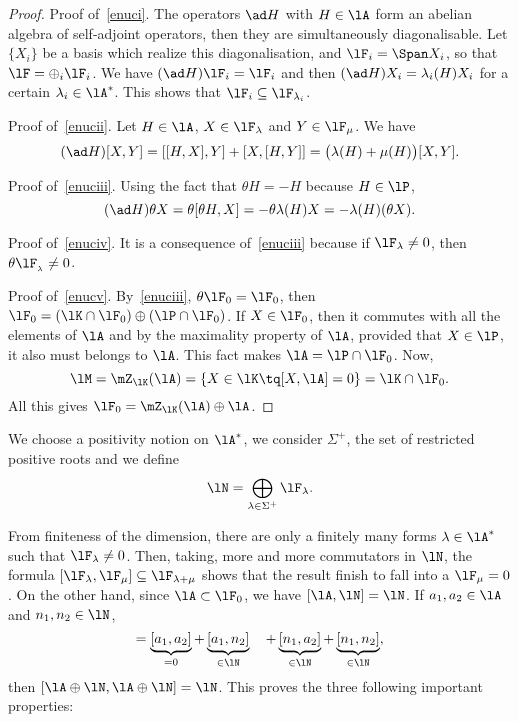 \begin{proof}
	Proof of~\ref{enuci}. The operators $\ad H$ with $H\in\lA$ form an abelian algebra of self-adjoint operators, then they are simultaneously diagonalisable. Let $\{X_i\}$ be a basis which realize this diagonalisation, and $\lF_i=\Span X_i$, so that $\lF=\oplus_i\lF_i$. We have $(\ad H)\lF_i=\lF_i$ and then $(\ad H)X_i=\lambda_i(H)X_i$ for a certain $\lambda_i\in\lA^*$. This shows that $\lF_i\subseteq\lF_{\lambda_i}$.

	Proof of~\ref{enucii}. Let $H\in\lA$, $X\in\lF_{\lambda}$ and $Y\in\lF_{\mu}$. We have
	\begin{equation}
		(\ad H)[X,Y]=[[H,X],Y]+[X,[H,Y]]
		=\big(  \lambda(H)+\mu(H) \big) [X,Y].
	\end{equation}

	Proof of~\ref{enuciii}. Using the fact that $\theta H=-H$ because $H\in\lP$,
	\begin{equation}
		(\ad H)\theta X=\theta[\theta H,X]
		=-\theta\lambda(H)X
		=-\lambda(H)(\theta X).
	\end{equation}

	Proof of~\ref{enuciv}. It is a consequence of~\ref{enuciii} because if $\lF_{\lambda}\neq 0$, then $\theta\lF_{_{\lambda}}\neq 0$.

	Proof of~\ref{enucv}. By~\ref{enuciii}, $\theta\lF_0=\lF_0$, then $\lF_0=(\lK\cap\lF_0)\oplus(\lP\cap\lF_0)$. If $X\in\lF_0$, then it commutes with all the elements of $\lA$ and by the maximality property of $\lA$, provided that $X\in\lP$, it also must belongs to $\lA$. This fact makes $\lA=\lP\cap\lF_0$. Now,
	\[
		\lM=\mZ_{\lK}(\lA)=\{X\in\lK\tq [X,\lA]=0\}=\lK\cap\lF_0.
	\]
	All this gives $\lF_0=\mZ_{\lK}(\lA)\oplus\lA$.
\end{proof}

We choose a positivity notion on $\lA^*$, we consider $\Sigma^+$, the set of restricted positive roots and we define
\[
	\lN=\bigoplus_{\lambda\in\Sigma^+}\lF_{\lambda}.
\]

From finiteness of the dimension, there are only a finitely many forms $\lambda\in\lA^*$ such that $\lF_{\lambda}\neq 0$. Then, taking, more and more commutators in $\lN$, the formula $[\lF_{\lambda},\lF_{\mu}]\subseteq\lF_{\lambda+\mu}$ shows that the result finish to fall into a $\lF_{\mu}=0$. On the other hand, since $\lA\subset\lF_0$, we have $[\lA,\lN]=\lN$. If $a_1,a_2\in\lA$ and $n_1,n_2\in\lN$,
\begin{equation}
	[a_1+n_1,a_2+n_2]=\underbrace{[a_1,a_2]}_{=0}+\underbrace{[a_1,n_2]}_{\in\lN}
	\quad+\underbrace{[n_1,a_2]}_{\in\lN}+\underbrace{[n_1,n_2]}_{\in\lN},
\end{equation}
then $[\lA\oplus\lN,\lA\oplus\lN]=\lN$. This proves the three following important properties:

